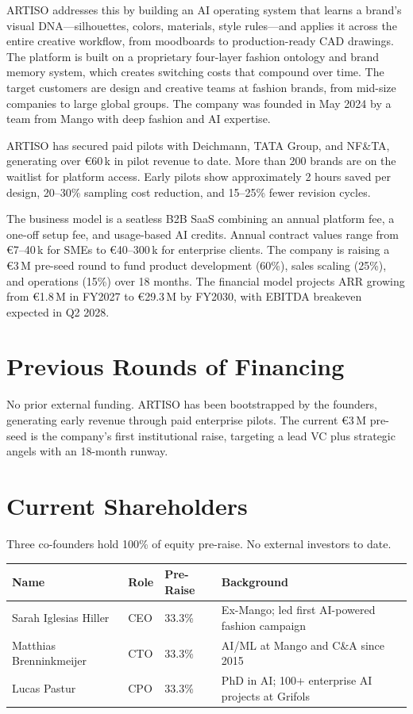 \documentclass[11pt,a4paper]{article}
\begin{document}
ARTISO addresses this by building an AI operating system that learns a brand's visual DNA---silhouettes, colors, materials, style rules---and applies it across the entire creative workflow, from moodboards to production-ready CAD drawings. The platform is built on a proprietary four-layer fashion ontology and brand memory system, which creates switching costs that compound over time. The target customers are design and creative teams at fashion brands, from mid-size companies to large global groups. The company was founded in May 2024 by a team from Mango with deep fashion and AI expertise.

ARTISO has secured paid pilots with Deichmann, TATA Group, and NF\&TA, generating over \euro{}60\,k in pilot revenue to date. More than 200 brands are on the waitlist for platform access. Early pilots show approximately 2 hours saved per design, 20--30\% sampling cost reduction, and 15--25\% fewer revision cycles.

The business model is a seatless B2B SaaS combining an annual platform fee, a one-off setup fee, and usage-based AI credits. Annual contract values range from \euro{}7--40\,k for SMEs to \euro{}40--300\,k for enterprise clients. The company is raising a \euro{}3\,M pre-seed round to fund product development (60\%), sales scaling (25\%), and operations (15\%) over 18 months. The financial model projects ARR growing from \euro{}1.8\,M in FY2027 to \euro{}29.3\,M by FY2030, with EBITDA breakeven expected in Q2 2028.

\section{Previous Rounds of Financing}

No prior external funding. ARTISO has been bootstrapped by the founders, generating early revenue through paid enterprise pilots. The current \euro{}3\,M pre-seed is the company's first institutional raise, targeting a lead VC plus strategic angels with an 18-month runway.

\section{Current Shareholders}

Three co-founders hold 100\% of equity pre-raise. No external investors to date.

\vspace{2pt}
\begin{tabularx}{\textwidth}{@{} l l l X @{}}
    \toprule
    \textbf{Name} & \textbf{Role} & \textbf{Pre-Raise} & \textbf{Background} \\
    \midrule
    Sarah Iglesias Hiller & CEO & 33.3\% & Ex-Mango; led first AI-powered fashion campaign \\
    Matthias Brenninkmeijer & CTO & 33.3\% & AI/ML at Mango and C\&A since 2015 \\
    Lucas Pastur & CPO & 33.3\% & PhD in AI; 100+ enterprise AI projects at Grifols \\
    \bottomrule
\end{tabularx}
\end{document}
